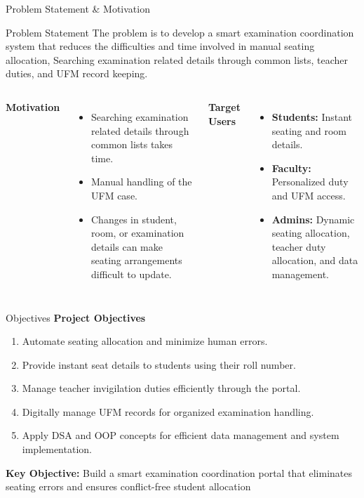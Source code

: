 \documentclass[aspectratio=169,11pt]{beamer}
\begin{document}
\begin{frame}{Problem Statement \& Motivation}
\begin{block}{Problem Statement}
 The problem is to develop a smart examination coordination system that reduces the difficulties and time involved in manual seating allocation, Searching examination related details through common lists, teacher duties, and UFM record keeping.
\end{block}
\vspace{2mm}
\begin{columns}[T,totalwidth=\textwidth]
\textbf{\color{GEUBlue}Motivation}
\begin{itemize}\itemsep2pt
\item Searching examination related details through common lists takes time.
\item Manual handling of the UFM case.
\item Changes in student, room, or examination details can make seating arrangements difficult to update.
\end{itemize}
\textbf{\color{GEUBlue}Target Users}
\begin{itemize}\itemsep2pt
\item \textbf{Students:} Instant seating and room details.
\item \textbf{Faculty:} Personalized duty and UFM access.
\item \textbf{Admins:} Dynamic seating allocation, teacher duty allocation, and data management.
\end{itemize}
\end{columns}
\end{frame}

\begin{frame}{Objectives}
\textbf{\color{GEUBlue}Project Objectives}
\vspace{1mm}
\begin{enumerate}\itemsep4pt
\item Automate seating allocation and minimize human errors.
\item Provide instant seat details to students using their roll number.
\item Manage teacher invigilation duties efficiently through the portal.
\item Digitally manage UFM records for organized examination handling.
\item Apply DSA and OOP concepts for efficient data management and system implementation.
\end{enumerate}
\vfill
\begin{center}
\colorbox{GEULightBlue}{\parbox{1\textwidth}{\centering
\textbf{Key Objective:} Build a smart examination coordination portal that eliminates seating errors and ensures conflict-free student allocation}}
\end{center}
\end{frame}
\end{document}
